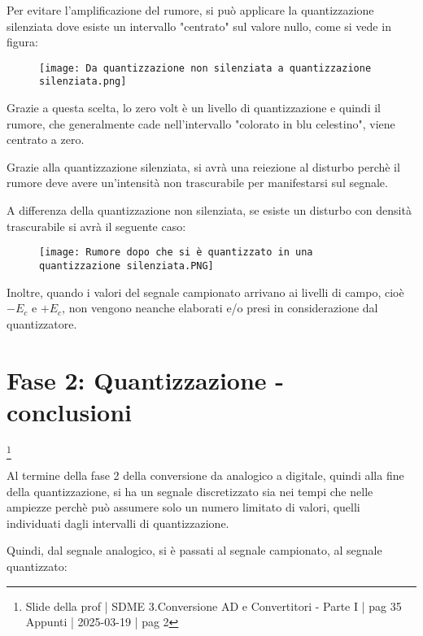 Per evitare l'amplificazione del rumore, si può applicare la quantizzazione silenziata dove esiste un intervallo "centrato" sul valore nullo, come si vede in figura: 

\begin{figure}[h]
    \centering
    \texttt{[image: Da quantizzazione non silenziata a quantizzazione silenziata.png]}
\end{figure} 

Grazie a questa scelta, lo zero volt è un livello di quantizzazione e quindi 
il rumore, che generalmente cade nell'intervallo "colorato in blu celestino", viene centrato a zero. \newline 

Grazie alla quantizzazione silenziata, si avrà una reiezione al disturbo perchè il rumore deve avere un'intensità non trascurabile per manifestarsi sul segnale. \newline 

A differenza della quantizzazione non silenziata, se esiste un disturbo con densità trascurabile si avrà il seguente caso: 

\begin{figure}[h]
    \centering
    \texttt{[image: Rumore dopo che si è quantizzato in una quantizzazione silenziata.PNG]}
\end{figure} 

Inoltre, quando i valori del segnale campionato arrivano ai livelli di campo, 
cioè $-E_c$ e $+E_c$, non vengono neanche elaborati e/o presi in considerazione dal quantizzatore. \newline 

\newpage 

\section{Fase 2: Quantizzazione - conclusioni}
\footnote{Slide della prof | SDME 3.Conversione AD e Convertitori - Parte I | pag 35 \\  
Appunti | 2025-03-19 | pag 2}

Al termine della fase 2 della conversione da analogico a digitale, quindi alla fine della quantizzazione, 
si ha un segnale discretizzato sia nei tempi che nelle ampiezze perchè può assumere solo un numero limitato di valori, quelli individuati dagli intervalli di quantizzazione. \newline 

Quindi, dal segnale analogico, si è passati al segnale campionato, al segnale quantizzato: 

